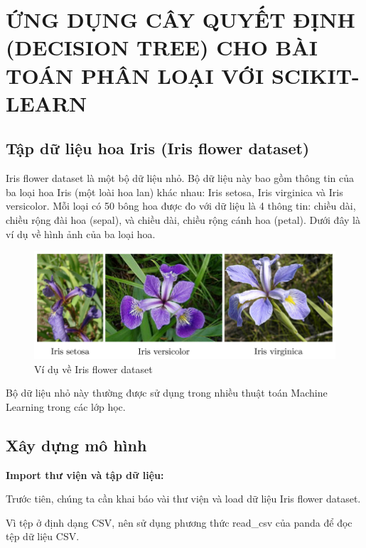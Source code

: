 \chapter{ỨNG DỤNG CÂY QUYẾT ĐỊNH (DECISION TREE)
CHO BÀI TOÁN PHÂN LOẠI VỚI SCIKIT-LEARN}

\section{Tập dữ liệu hoa Iris (Iris flower dataset)}
Iris flower dataset là một bộ dữ liệu nhỏ. Bộ dữ liệu này bao gồm
thông tin của ba loại hoa Iris (một loài hoa lan) khác nhau:
Iris setosa, Iris virginica và Iris versicolor.
Mỗi loại có 50 bông hoa được đo với dữ liệu là 4 thông tin:
chiều dài, chiều rộng đài hoa (sepal), và chiều dài, chiều rộng cánh hoa (petal).
Dưới đây là ví dụ về hình ảnh của ba loại hoa.\newpage

\begin{center}
    \begin{figure}[h!]
        \begin{center}
         \includegraphics[scale=0.7]{thesis/decision-tree/app/iris.png}
        \end{center}
        \caption{Ví dụ về Iris flower dataset}
        \label{fig:iris}
    \end{figure}
\end{center}

Bộ dữ liệu nhỏ này thường được sử dụng trong nhiều thuật toán
Machine Learning trong các lớp học.

\section{Xây dựng mô hình}
\textbf{Import thư viện và tập dữ liệu:}

Trước tiên, chúng ta cần khai báo vài thư viện và load dữ liệu Iris flower dataset.

Vì tệp ở định dạng CSV, nên sử dụng phương thức read\_csv của panda để đọc tệp dữ liệu CSV.


